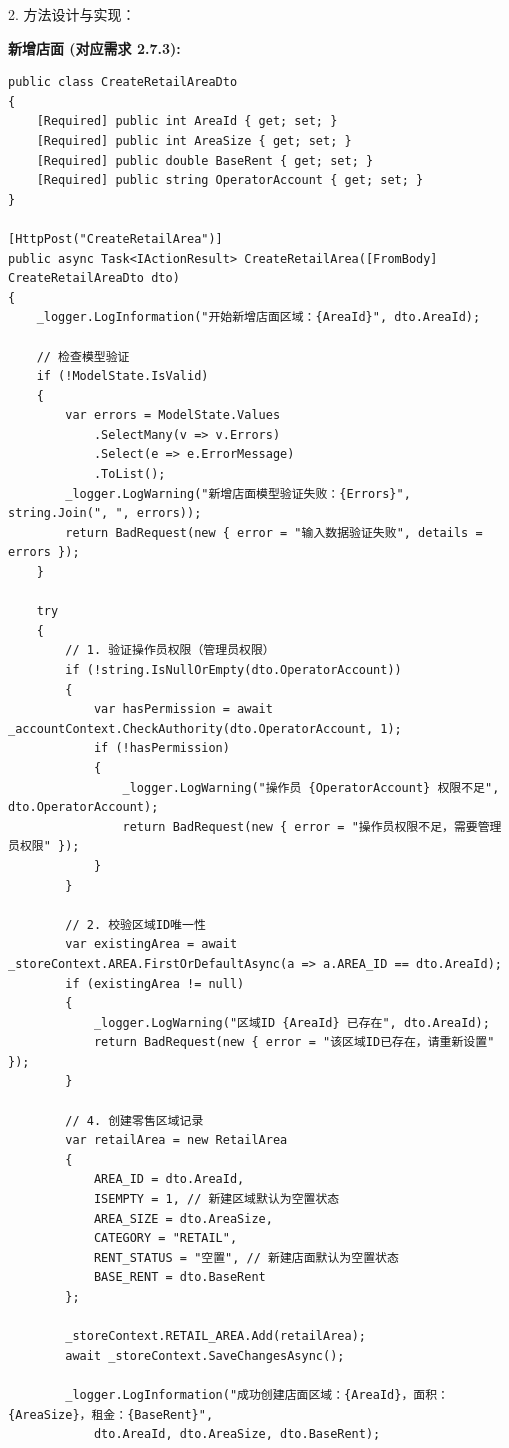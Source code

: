 \documentclass[]{article}
\begin{document}
2. 方法设计与实现：

\textbf{新增店面 (对应需求 2.7.3):}
\begin{verbatim}
public class CreateRetailAreaDto
{
    [Required] public int AreaId { get; set; }
    [Required] public int AreaSize { get; set; }
    [Required] public double BaseRent { get; set; }
    [Required] public string OperatorAccount { get; set; }
}

[HttpPost("CreateRetailArea")]
public async Task<IActionResult> CreateRetailArea([FromBody] CreateRetailAreaDto dto)
{
    _logger.LogInformation("开始新增店面区域：{AreaId}", dto.AreaId);

    // 检查模型验证
    if (!ModelState.IsValid)
    {
        var errors = ModelState.Values
            .SelectMany(v => v.Errors)
            .Select(e => e.ErrorMessage)
            .ToList();
        _logger.LogWarning("新增店面模型验证失败：{Errors}", string.Join(", ", errors));
        return BadRequest(new { error = "输入数据验证失败", details = errors });
    }

    try
    {
        // 1. 验证操作员权限（管理员权限）
        if (!string.IsNullOrEmpty(dto.OperatorAccount))
        {
            var hasPermission = await _accountContext.CheckAuthority(dto.OperatorAccount, 1);
            if (!hasPermission)
            {
                _logger.LogWarning("操作员 {OperatorAccount} 权限不足", dto.OperatorAccount);
                return BadRequest(new { error = "操作员权限不足，需要管理员权限" });
            }
        }

        // 2. 校验区域ID唯一性
        var existingArea = await _storeContext.AREA.FirstOrDefaultAsync(a => a.AREA_ID == dto.AreaId);
        if (existingArea != null)
        {
            _logger.LogWarning("区域ID {AreaId} 已存在", dto.AreaId);
            return BadRequest(new { error = "该区域ID已存在，请重新设置" });
        }

        // 4. 创建零售区域记录
        var retailArea = new RetailArea
        {
            AREA_ID = dto.AreaId,
            ISEMPTY = 1, // 新建区域默认为空置状态
            AREA_SIZE = dto.AreaSize,
            CATEGORY = "RETAIL",
            RENT_STATUS = "空置", // 新建店面默认为空置状态
            BASE_RENT = dto.BaseRent
        };

        _storeContext.RETAIL_AREA.Add(retailArea);
        await _storeContext.SaveChangesAsync();

        _logger.LogInformation("成功创建店面区域：{AreaId}，面积：{AreaSize}，租金：{BaseRent}", 
            dto.AreaId, dto.AreaSize, dto.BaseRent);


\end{verbatim}
\end{document}
